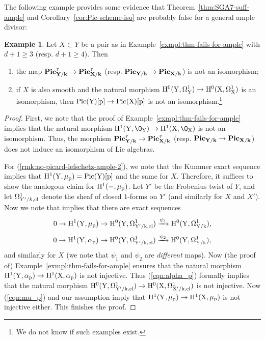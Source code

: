 \documentclass[11pt,reqno]{amsart}
\numberwithin{equation}{section}
\theoremstyle{definition}
\newtheorem{example}[thm]{Example}
\begin{document}
The following example provides some evidence that Theorem~\ref{thm:SGA7-suff-ample} and Corollary~\ref{cor:Pic-scheme-iso} are probably false for a general ample divisor:

\begin{example}\label{rmk:no-picard-lefschetz-ample} Let $X\subset Y$ be a pair as in Example~\ref{exmpl:thm-fails-for-ample} with $d+1\geq 3$ (resp. $d+1\geq 4$). Then 
\begin{enumerate}
    \item\label{rmk:no-picard-lefschetz-ample-1} the map $\bf{Pic}^\tau_{Y/k} \to \bf{Pic}^\tau_{X/k}$ (resp. $\bf{Pic}_{Y/k} \to \bf{Pic}_{X/k}$) is not an isomorphism;
    \item\label{rmk:no-picard-lefschetz-ample-2} if $X$ is also smooth and the natural morphism $\rm{H}^0(Y,\Omega^1_Y)\to \rm{H}^0(X, \Omega^1_X)$ is an isomorphism, then $\rm{Pic}(Y)[p] \to \rm{Pic}(X)[p]$ is not an isomorphism.\footnote{We do not know if such examples exist.}
\end{enumerate}
\end{example}
\begin{proof}
    First, we note that the proof of Example~\ref{exmpl:thm-fails-for-ample} implies that the natural morphism $\rm{H}^1(Y, \O_Y) \to \rm{H}^1(X, \O_X)$ is not an isomorphism. Thus, the morphism $\bf{Pic}^\tau_{Y/k} \to \bf{Pic}^\tau_{X/k}$ (resp. $\bf{Pic}_{Y/k} \to \bf{Pic}_{X/k}$) does not induce an isomorphism of Lie algebras. \smallskip

    For (\ref{rmk:no-picard-lefschetz-ample-2}), we note that the Kummer exact sequence implies that $\rm{H}^1(Y, \mu_p) = \rm{Pic}(Y)[p]$ and the same for $X$. Therefore, it suffices to show the analogous claim for $\rm{H}^1(-, \mu_p)$. Let $Y'$ be the Frobenius twist of $Y$, and let $\Omega^1_{Y'/k, \rm{cl}}$ denote the sheaf of closed $1$-forms on $Y'$ (and similarly for $X$ and $X'$). Now we note that \cite[Prop.~2.4]{Artin-Milne} implies that there are exact sequences
    \begin{equation}\label{eqn:mu_p}
    0 \to \rm{H}^1(Y, \mu_p) \to \rm{H}^0(Y, \Omega^1_{Y'/k, \rm{cl}}) \xrightarrow{\psi_1} \rm{H}^0(Y, \Omega^1_{Y/k}),
    \end{equation}
    \begin{equation}\label{eqn:alpha_p}
    0 \to \rm{H}^1(Y, \alpha_p) \to \rm{H}^0(Y, \Omega^1_{Y'/k, \rm{cl}}) \xrightarrow{\psi_2} \rm{H}^0(Y, \Omega^1_{Y/k}),
    \end{equation}
    and similarly for $X$ (we note that $\psi_1$ and $\psi_2$ are {\it different} maps). Now (the proof of) Example~\ref{exmpl:thm-fails-for-ample} ensures that the natural morphism $\rm{H}^1(Y, \alpha_p) \to \rm{H}^1(X, \alpha_p)$ is not injective. Thus (\ref{eqn:alpha_p}) formally implies that the natural morphism $\rm{H}^0(Y, \Omega^1_{Y'/k, \rm{cl}}) \to \rm{H}^0(X, \Omega^1_{X'/k, \rm{cl}})$ is not injective. Now (\ref{eqn:mu_p}) and our assumption imply that $\rm{H}^1(Y, \mu_p) \to \rm{H}^1(X, \mu_p)$ is not injective either. This finishes the proof. 
\end{proof}











\end{document}
